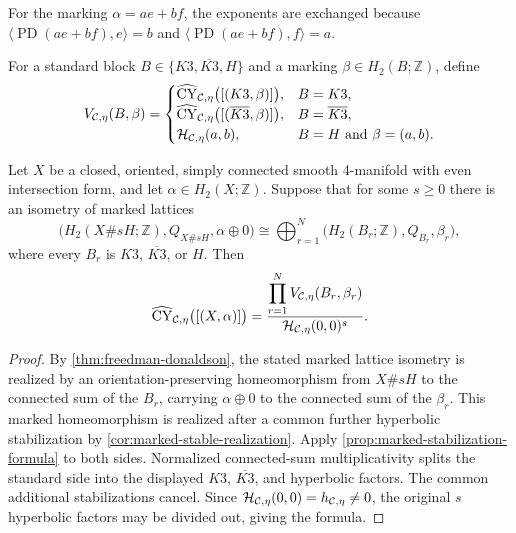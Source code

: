 \begin{remark}
\label{rem:exchanged-hyperbolic-exponents}
For the marking \(\alpha=ae+bf\), the exponents are exchanged because
$\langle\operatorname{PD}(ae+bf),e\rangle=b$ and
$\langle\operatorname{PD}(ae+bf),f\rangle=a$.
\end{remark}

\begin{definition}
\label{def:standard-block-value}
For a standard block \(B\in\{K3,\overline{K3},H\}\) and a marking
\(\beta\in H_2(B;\mathbb Z)\), define
\[
  V_{\mathcal{C},\eta}(B,\beta)=
  \begin{cases}
    \widehat{\operatorname{CY}}_{\mathcal{C},\eta}\bigl([(K3,\beta)]\bigr),&B=K3,\\
    \widehat{\operatorname{CY}}_{\mathcal{C},\eta}\bigl([(\overline{K3},\beta)]\bigr),
      &B=\overline{K3},\\
    \mathcal H_{\mathcal{C},\eta}(a,b),
      &B=H\text{ and }\beta=(a,b).
  \end{cases}
\]
\end{definition}

\begin{proposition}
\label{prop:even-formula}
Let $X$ be a closed, oriented, simply connected smooth 4-manifold with
even intersection form, and let $\alpha\in H_2(X;\mathbb Z)$.  Suppose that
for some $s\geq0$ there is an isometry of marked lattices
\[
  \bigl(H_2(X\#sH;\mathbb Z),Q_{X\#sH},\alpha\oplus0\bigr)
  \cong
  \bigoplus_{r=1}^{N}
    \bigl(H_2(B_r;\mathbb Z),Q_{B_r},\beta_r\bigr),
\]
where every $B_r$ is $K3$, $\overline{K3}$, or $H$.  Then
\[
  \widehat{\operatorname{CY}}_{\mathcal{C},\eta}\bigl([(X,\alpha)]\bigr)
  =\frac{\displaystyle\prod_{r=1}^{N}
      V_{\mathcal{C},\eta}(B_r,\beta_r)}
    {\mathcal H_{\mathcal{C},\eta}(0,0)^s}.
\]
\end{proposition}

\begin{proof}
By \cref{thm:freedman-donaldson}, the stated marked lattice isometry is
realized by an orientation-preserving homeomorphism from $X\#sH$ to the
connected sum of the $B_r$, carrying $\alpha\oplus0$ to the connected sum
of the $\beta_r$.  This marked homeomorphism is realized after a common
further hyperbolic stabilization by
\cref{cor:marked-stable-realization}.  Apply
\cref{prop:marked-stabilization-formula} to both sides.  Normalized
connected-sum multiplicativity splits the standard side into the displayed
$K3$, $\overline{K3}$, and hyperbolic factors.  The common additional
stabilizations cancel.  Since
$\mathcal H_{\mathcal{C},\eta}(0,0)=h_{\mathcal{C},\eta}\neq0$, the original $s$
hyperbolic factors may be divided out, giving the formula.
\end{proof}

